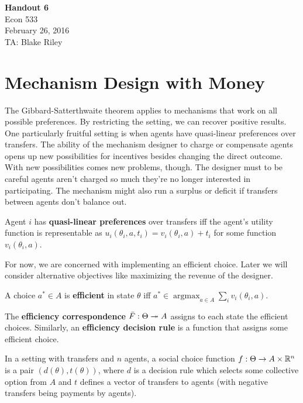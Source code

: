 \documentclass[10pt]{article}
\def\HandoutNumber{6}
\def\TheDate{February 26, 2016}
\def\Name{Blake Riley}
\begin{document}
\begin{spacing}{1.0}

\noindent
\textbf{Handout \HandoutNumber} \\
Econ 533 \\
\TheDate \\
TA: \Name \\

\section{Mechanism Design with Money}
\label{sec:vick-clarke-grov}

The Gibbard-Satterthwaite theorem applies to mechanisms that work on all possible
preferences. By restricting the setting, we can recover positive results. One
particularly fruitful setting is when agents have quasi-linear preferences over
transfers. The ability of the mechanism designer to charge or compensate agents opens
up new possibilities for incentives besides changing the direct outcome. With new
possibilities comes new problems, though. The designer must to be careful agents
aren't charged so much they're no longer interested in participating. The mechanism
might also run a surplus or deficit if transfers between agents don't balance out.

\begin{definition}
  Agent $i$ has \textbf{quasi-linear preferences} over transfers iff the
  agent's utility function is representable as $u_i(\theta_i, a, t_i) =
  v_i(\theta_i,a)+t_i$ for some function $v_i(\theta_i,a)$.
\end{definition}

For now, we are concerned with implementing an efficient choice. Later we
will consider alternative objectives like maximizing the revenue of the
designer.

\begin{definition}
  A choice $a^* \in A$ is \textbf{efficient} in state $\theta$ iff $a^* \in
  \operatorname{argmax}_{a\in A} \sum_i v_i(\theta_i, a)$.
\end{definition}

\begin{definition}
  The \textbf{efficiency correspondence} $\bar{F}:\Theta \twoheadrightarrow A$ assigns to
  each state the efficient choices. Similarly, an \textbf{efficiency
    decision rule} is a function that assigns some efficient choice.
\end{definition}

\begin{definition}
  In a setting with transfers and $n$ agents, a social choice function
  $f:\Theta \to A\times \mathbb{R}^n$ is a pair $(d(\theta), t(\theta))$, where $d$
  is a decision rule which selects some collective option from $A$ and $t$
  defines a vector of transfers to agents (with negative transfers being
  payments by agents).
\end{definition}


\end{spacing}
\end{document}
